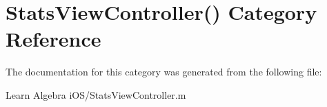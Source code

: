 \hypertarget{category_stats_view_controller_07_08}{\section{Stats\-View\-Controller() Category Reference}
\label{category_stats_view_controller_07_08}
}


The documentation for this category was generated from the following file\-:\begin{DoxyCompactItemize}
\item 
Learn Algebra i\-O\-S/Stats\-View\-Controller.\-m\end{DoxyCompactItemize}
